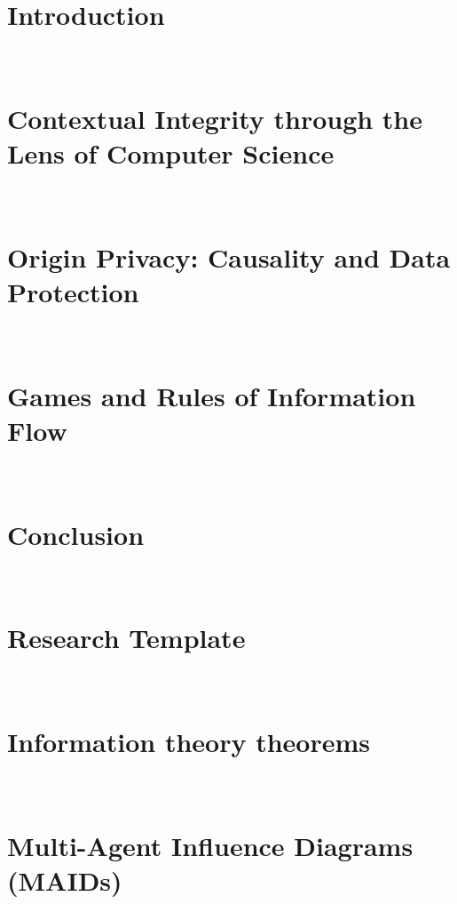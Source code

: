 \documentclass[12pt, oneside]{lib/ucthesis}
\def\ssp{\def\baselinestretch{1.0}\large\normalsize}
\begin{document}
\tableofcontents
\listoffigures 
\listoftables

\begin{acknowledgements}
\thispagestyle{plain}
 
\end{acknowledgements}




\begin{dissertationText}
\chapter{Introduction}~\label{chapter:introduction}
	
\chapter{Contextual Integrity through the Lens of Computer Science}~\label{chapter:CI-through-CS}

\chapter{Origin Privacy: Causality and Data Protection}~\label{chapter:origin-privacy}
	
\chapter[Games and Rules]{Games and Rules of Information Flow}~\label{chapter:games-and-rules}


\chapter{Conclusion}~\label{chapter:conclusion}


\ssp	%



\appendix
\chapter[Research Template]{Research Template}~\label{appendix:template}


\chapter[DPI Theorems]{Information theory theorems}~\label{appendix:information-theory-theorems}


\chapter[Multi-Agent Influence Diagrams]{Multi-Agent Influence Diagrams (MAIDs)}~\label{appendix:maid}
	

\end{dissertationText}
\end{document}

